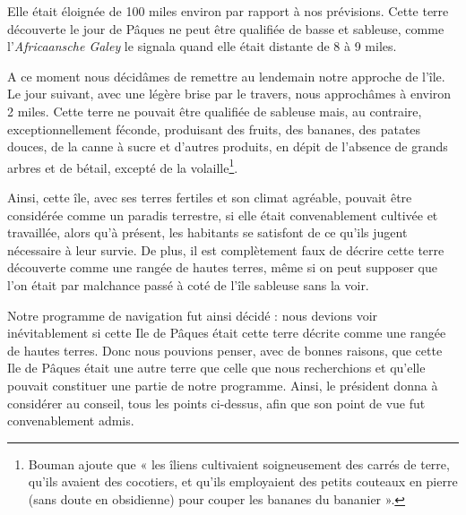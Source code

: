 \documentclass{article}
\begin{document}
        
    Elle était éloignée de 100 miles environ par rapport à nos prévisions. Cette terre découverte le jour de Pâques ne peut être qualifiée de basse et sableuse, comme l'\textit{Africaansche Galey} le signala quand elle était distante de 8 à 9 miles. 
            
        
    A ce moment nous décidâmes de remettre au lendemain notre approche de l'île. Le jour suivant, avec une légère brise par le travers, nous approchâmes à environ 2 miles. Cette terre ne pouvait être qualifiée de sableuse mais, au contraire, exceptionnellement féconde, produisant des fruits, des bananes, des patates douces, de la canne à sucre et d'autres produits, en dépit de l'absence de grands arbres et de bétail, excepté de la volaille\footnote{Bouman ajoute que « les îliens cultivaient soigneusement des carrés de terre, qu'ils avaient des cocotiers, et qu'ils employaient des petits couteaux en pierre (sans doute en obsidienne) pour couper les bananes du bananier ».}.
            
        
    Ainsi, cette île, avec ses terres fertiles et son climat agréable, pouvait être considérée comme un paradis terrestre, si elle était convenablement cultivée et travaillée, alors qu'à présent, les habitants se satisfont de ce qu'ils jugent nécessaire à leur survie. De plus, il est complètement faux de décrire cette terre découverte comme une rangée de hautes terres, même si on peut supposer que l'on était par malchance passé à coté de l'île sableuse sans la voir.
            
        
    Notre programme de navigation fut ainsi décidé : nous devions voir inévitablement si cette Ile de Pâques était cette terre décrite comme une rangée de hautes terres. Donc nous pouvions penser, avec de bonnes raisons, que cette Ile de Pâques était une autre terre que celle que nous recherchions et qu'elle pouvait constituer une partie de notre programme. Ainsi, le président donna à considérer au conseil, tous les points ci-dessus, afin que son point de vue fut convenablement admis.
            
\end{document}
